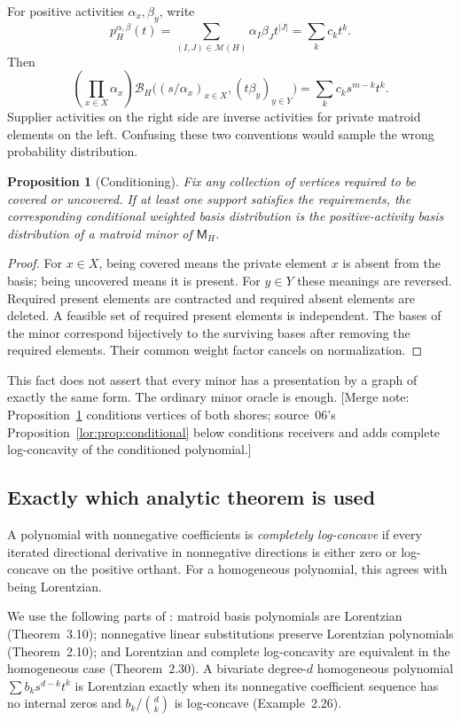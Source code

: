 \documentclass[11pt]{article}
\numberwithin{equation}{section}
\newtheorem{proposition}[theorem]{Proposition}
\theoremstyle{definition}
\newcommand{\PM}{\mathcal M}
\newcommand{\cB}{\mathcal B}
\begin{document}
For positive activities $\alpha_x,\beta_y$, write
\[
 p_H^{\alpha,\beta}(t)
 =\sum_{(I,J)\in\PM(H)}\alpha_I\beta_J t^{|J|}
 =\sum_k c_k t^k.
\]
Then
\begin{equation}
 \left(\prod_{x\in X}\alpha_x\right)
 \cB_H\bigl((s/\alpha_x)_{x\in X},(t\beta_y)_{y\in Y}\bigr)
 =\sum_k c_k s^{m-k}t^k.
 \label{lor:sp:eq:weightlift}
\end{equation}
Supplier activities on the right side are inverse activities for private
matroid elements on the left. Confusing these two conventions would sample
the wrong probability distribution.

\begin{proposition}[Conditioning]
\label{lor:sp:prop:conditioning}
Fix any collection of vertices required to be covered or uncovered. If at least
one support satisfies the requirements, the corresponding conditional weighted
basis distribution is the positive-activity basis distribution of a matroid
minor of $\mathsf M_H$.
\end{proposition}
\begin{proof}
For $x\in X$, being covered means the private element $x$ is absent from the
basis; being uncovered means it is present. For $y\in Y$ these meanings are
reversed. Required present elements are contracted and required absent elements
are deleted. A feasible set of required present elements is independent.
The bases of the minor correspond bijectively to the surviving bases after
removing the required elements. Their common weight factor cancels on
normalization.
\end{proof}
This fact does not assert that every minor has a presentation by a graph of
exactly the same form. The ordinary minor oracle is enough.
[Merge note: Proposition~\ref{lor:sp:prop:conditioning} conditions vertices
of both shores; source~06's Proposition~\ref{lor:prop:conditional} below
conditions receivers and adds complete log-concavity of the conditioned
polynomial.]

\subsection{Exactly which analytic theorem is used}
A polynomial with nonnegative coefficients is \emph{completely
log-concave} if every iterated directional derivative in nonnegative
directions is either zero or log-concave on the positive orthant. For a
homogeneous polynomial, this agrees with being Lorentzian.

We use the following parts of \cite{BH}: matroid basis polynomials are
Lorentzian (Theorem~3.10); nonnegative linear substitutions preserve
Lorentzian polynomials (Theorem~2.10); and Lorentzian and complete
log-concavity are equivalent in the homogeneous case (Theorem~2.30).
A bivariate degree-$d$ homogeneous polynomial
$\sum b_ks^{d-k}t^k$ is Lorentzian exactly when its nonnegative coefficient
sequence has no internal zeros and $b_k/\binom d k$ is log-concave
(Example~2.26).
\end{document}

